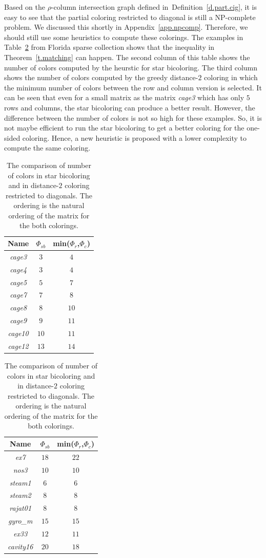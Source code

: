 \documentclass[11pt, twoside,a4paper]{book}
\newcommand{\defref}[1]{Definition~\protect\ref{#1}}
\newcommand{\appref}[1]{Appendix~\protect\ref{#1}}
\newcommand{\sparsifysymbol}{\ensuremath{\rho}}
\begin{document}
Based on the $\sparsifysymbol$-column intersection graph defined in~\defref{d.part.cig},
it is easy to see
that the partial coloring restricted to diagonal is still a NP-complete problem.
We discussed this shortly in \appref{app.npcomp}.
Therefore, we should still use some heuristics to compute these colorings.
The examples in Table~\ref{table.starbic.d2.diag} from Florida sparse collection shows that the
inequality in Theorem~\ref{t.matching} can happen. The second column of this table
shows the number of colors computed by the heurstic for star bicoloring.
The third column shows the number of colors computed by the greedy distance-$2$ coloring
in which the minimum number of colors between the row and column version is selected.
It can be seen that even for a small matrix as the matrix \textit{cage3} which has only
$5$ rows and columns, the star bicoloring can produce a better result.
However, the difference between the number of colors is not so high for these examples.
So, it is not maybe efficient to run the star bicoloring to get a better coloring for
the one-sided coloring. Hence, a new heuristic is proposed with a lower complexity
to compute the same coloring.
\begin{table}
\centering
\begin{tabular}{|c|c|c|}
\hline
Name & $\Phi_{sb}$ & min($\Phi_r$,$\Phi_c$)\\\hline
\textit{cage3} & $3$ & $4$\\\hline
\textit{cage4} & $3$ & $4$ \\\hline
\textit{cage5} & $5$ & $7$\\\hline
\textit{cage7} & $7$  & $8$\\\hline
\textit{cage8} & $8$  & $10$\\\hline
\textit{cage9} & $9$  & $11$\\\hline
\textit{cage10} & $10$ & $11$\\\hline
\textit{cage12} & $13$ &  $14$\\\hline
\end{tabular}
\hfill
\begin{tabular}{|c|c|c|}
\hline
Name & $\Phi_{sb}$ & min($\Phi_r$,$\Phi_c$)\\\hline
\textit{ex7} & $18$ & $22$ \\\hline
\textit{nos3} & $10$ & $10$ \\\hline
\textit{steam1} & $6$ & $6$ \\\hline
\textit{steam2} & $8$ & $8$ \\\hline
\textit{rajat01} & $8$ & $8$ \\\hline
\textit{gyro\_m} & $15$ & $15$\\\hline
\textit{ex33} & $12$ & $11$\\\hline
\textit{cavity16} & $20$ & $18$ \\\hline
\end{tabular}

\caption{The comparison of number of colors in star bicoloring and in
distance-$2$ coloring restricted to diagonals.
The ordering is the natural ordering of the matrix for the both colorings.
}
\label{table.starbic.d2.diag}
\end{table}
\end{document}
